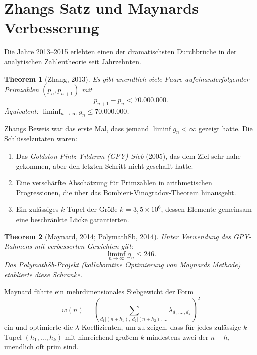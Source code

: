 \documentclass[12pt,a4paper]{amsart}
\newtheorem{theorem}{Theorem}[section]
\theoremstyle{definition}
\begin{document}
\section{Zhangs Satz und Maynards Verbesserung}

Die Jahre 2013--2015 erlebten einen der dramatischsten Durchbr\"{u}che in der
analytischen Zahlentheorie seit Jahrzehnten.

\begin{theorem}[Zhang, 2013]
\label{thm:zhang}
Es gibt unendlich viele Paare aufeinanderfolgender Primzahlen $(p_n, p_{n+1})$
mit
\[
  p_{n+1} - p_n < 70{.}000{.}000.
\]
\"{A}quivalent: $\liminf_{n \to \infty} g_n \leq 70{.}000{.}000$.
\end{theorem}

Zhangs Beweis war das erste Mal, dass jemand $\liminf g_n < \infty$ gezeigt
hatte. Die Schl\"{u}sselzutaten waren:
\begin{enumerate}[label=(\roman*)]
  \item Das \emph{Goldston-Pintz-Y{\i}ld{\i}r{\i}m (GPY)-Sieb} (2005), das
        dem Ziel sehr nahe gekommen, aber den letzten Schritt nicht geschafft hatte.
  \item Eine versch\"{a}rfte Absch\"{a}tzung f\"{u}r Primzahlen in arithmetischen
        Progressionen, die \"{u}ber das Bombieri-Vinogradov-Theorem hinausgeht.
  \item Ein zul\"{a}ssiges $k$-Tupel der Gr\"{o}\ss{}e $k = 3{,}5 \times 10^6$, dessen
        Elemente gemeinsam eine beschr\"{a}nkte L\"{u}cke garantierten.
\end{enumerate}

\begin{theorem}[Maynard, 2014; Polymath8b, 2014]
\label{thm:maynard}
Unter Verwendung des GPY-Rahmens mit verbesserten Gewichten gilt:
\[
  \liminf_{n \to \infty} g_n \leq 246.
\]
Das Polymath8b-Projekt (kollaborative Optimierung von Maynards Methode)
etablierte diese Schranke.
\end{theorem}

Maynard f\"{u}hrte ein mehrdimensionales Siebgewicht der Form
\[
  w(n) = \left(\sum_{d_1 | (n+h_1),\, d_2 | (n+h_2),\, \ldots} \lambda_{d_1, \ldots, d_k}\right)^2
\]
ein und optimierte die $\lambda$-Koeffizienten, um zu zeigen, dass f\"{u}r jedes
zul\"{a}ssige $k$-Tupel $(h_1,\ldots,h_k)$ mit hinreichend gro\ss{}em $k$ mindestens
zwei der $n+h_i$ unendlich oft prim sind.
\end{document}
